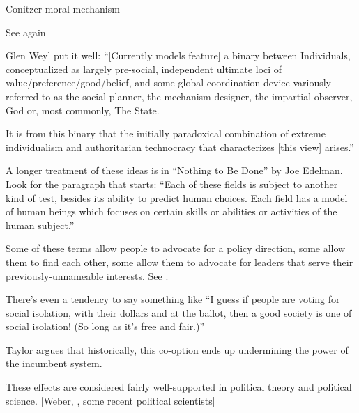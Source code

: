 \begin{thebibliography}{99}
 Conitzer moral mechanism

 See \cite{klingefjord2024} again

 Glen Weyl put it well:
``[Currently models feature] a binary between Individuals, conceptualized as largely pre-social, independent ultimate loci of value/preference/good/belief, and some global coordination device variously referred to as the social planner, the mechanism designer, the impartial observer, God or, most commonly, The State.

It is from this binary that the initially paradoxical combination of extreme individualism and authoritarian technocracy that characterizes [this view] arises.''

 A longer treatment of these ideas is in ``Nothing to Be Done'' by Joe Edelman. Look for the paragraph that starts:
``Each of these fields is subject to another kind of test, besides its ability to predict human choices. Each field has a model of human beings which focuses on certain skills or abilities or activities of the human subject.''

 Some of these terms allow people to advocate for a policy direction, some allow them to find each other, some allow them to advocate for leaders that serve their previously-unnameable interests. See \cite{taylor2003}.

 There's even a tendency to say something like ``I guess if people are voting for social isolation, with their dollars and at the ballot, then a good society is one of social isolation! (So long as it's free and fair.)''

 \cite{taylor2003} Taylor argues that historically, this co-option ends up undermining the power of the incumbent system.

 These effects are considered fairly well-supported in political theory and political science. [Weber, \cite{taylor2003}, some recent political scientists]

\end{thebibliography}

